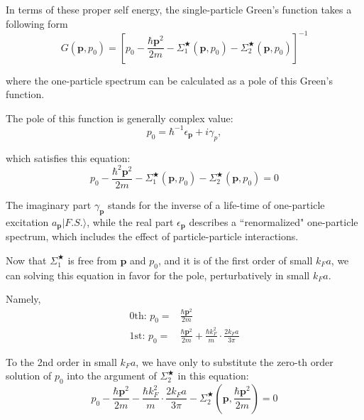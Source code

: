 In terms of these proper self energy, the single-particle Green's function takes a following form
\[ G(\mathbf{p},p_0) = \left[p_0-\frac{\hbar \mathbf{p}^2}{2m} - \Sigma_1^{\bigstar}(\mathbf{p},p_0)-\Sigma_2^{\bigstar}(\mathbf{p},p_0)\right]^{-1} \]

where the one-particle spectrum can be calculated as a pole of this Green's function.

The pole of this function is generally complex value:
\begin{equation} \label{Eqs2.7.30}
p_0 = \hbar^{-1}\epsilon_{\mathbf{p}} +i \gamma_p,
\end{equation}

which satisfies this equation:
\begin{equation} \label{Eqs2.7.31}
p_0 - \frac{\hbar^2\mathbf{p}^2}{2m}-\Sigma_1^{\bigstar}(\mathbf{p},p_0)-\Sigma_2^{\bigstar}(\mathbf{p},p_0) = 0
\end{equation}

The imaginary part $\gamma_{\mathbf{p}}$ stands for the inverse of a life-time of one-particle excitation $a_{\mathbf{p}} |F.S.\rangle$, while the real part $\epsilon_{\mathbf{p}}$ describes a ``renormalized" one-particle spectrum, which includes the effect of particle-particle interactions.

Now that $\Sigma_1^{\bigstar}$ is free from $\mathbf{p}$ and $p_0$, and it is of the first order of small $k_F a$, we can solving this equation in favor for the pole, perturbatively in small $k_F a$.

Namely,
\[ \begin{split}
\text{0th: } p_0=&\frac{\hbar\mathbf{p}^2}{2m}\\
\text{1st: } p_0=&\frac{\hbar\mathbf{p}^2}{2m} + \frac{\hbar k_F^2}{m}\cdot\frac{2 k_F a}{3\pi}
\end{split} \]

To the 2nd order in small $k_F a$, we have only to substitute the zero-th order solution of $p_0$ into the argument of $\Sigma_2^{\bigstar}$ in this equation:
\[ p_0 - \frac{\hbar \mathbf{p}^2}{2m}-\frac{\hbar k_F^2}{m}\cdot\frac{2 k_F a}{3\pi} - \Sigma_2^{\bigstar}(\mathbf{p},\frac{\hbar \mathbf{p}^2}{2m}) = 0\]

